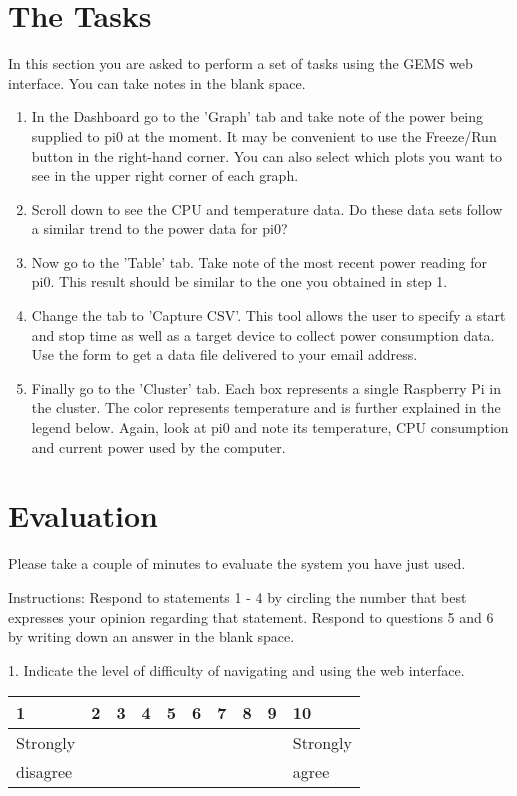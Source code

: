 \documentclass[12pt]{article}
\begin{document}
\section{The Tasks}
In this section you are asked to perform a set of tasks using the GEMS web interface. You can take notes in the blank space. 
\begin{enumerate}
  \item In the Dashboard go to the 'Graph' tab and take note of the power being supplied to pi0 at the moment. It may be convenient to use the Freeze/Run button in the right-hand corner. You can also select which plots you want to see in the upper right corner of each graph.\\
  \item Scroll down to see the CPU and temperature data. Do these data sets follow a similar trend to the power data for pi0?\\
  \item Now go to the 'Table' tab. Take note of the most recent power reading for pi0. This result should be similar to the one you obtained in step 1.\\
  \item Change the tab to 'Capture CSV'. This tool allows the user to specify a start and stop time as well as a target device to collect power consumption data. Use the form to get a data file delivered to your email address.\\
  \item Finally go to the 'Cluster' tab. Each box represents a single Raspberry Pi in the cluster. The color represents temperature and is further explained in the legend below. Again, look at pi0 and note its temperature, CPU consumption and current power used by the computer.
\end{enumerate}
\newpage
\section{Evaluation}
Please take a couple of minutes to evaluate the system you have just used.

Instructions: Respond to statements 1 - 4 by circling the number that best expresses your opinion regarding that statement. Respond to questions 5 and 6 by writing down an answer in the blank space.

1. Indicate the level of difficulty of navigating and using the web interface.
\vspace{-5ex}
\begin{center}
\begin{tabular}{
|m{3em}|m{3em}|m{3em}|m{3em}|m{3em}|m{3em}|m{3em}|m{3em}|m{3em}|m{3em}| }
\hline
 1 & 2 & 3 & 4 & 5 & 6 & 7 & 8 & 9 & 10 \\ 
 \hline
 Strongly &&&&&&&&& Strongly\\
 disagree &&&&&&&&& agree\\
  \hline
\end{tabular}
\end{center}
\end{document}
